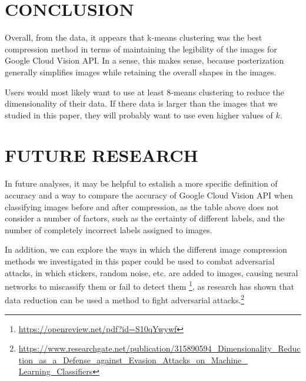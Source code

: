 \documentclass[letterpaper, 12 pt, conference]{ieeeconf}  %
\begin{document}
\section{CONCLUSION}

Overall, from the data, it appears that k-means clustering was
the best compression method in terms of maintaining the legibility
of the images for Google Cloud Vision API. In a sense, this makes
sense, because posterization generally simplifies images while
retaining the overall shapes in the images.

Users would most likely want to use at least 8-means clustering
to reduce the dimensionality of their data.
If there data is larger than the images that we studied in this paper,
they will probably want to use even higher values of $k$.

\section{FUTURE RESEARCH}

In future analyses, it may be helpful to estalish a more
specific definition of accuracy and a way to compare
the accuracy of Google Cloud Vision API when classifying
images before and after compression, as the table
above does not consider a number of factors, such as
the certainty of different labels, and the number
of completely incorrect labels assigned to images.

In addition, we can explore the ways in which the different
image compression methods we investigated in this paper
could be used to combat adversarial attacks, in which
stickers, random noise, etc. are added to images, causing
neural networks to miscassify them or fail to detect them
\footnote{\url{https://openreview.net/pdf?id=S10qYwywf}},
as research has shown that data reduction can be used a method to fight
adversarial attacks.\footnote{\url{https://www.researchgate.net/publication/315890594\_Dimensionality\_Reduction\_as\_a\_Defense\_against\_Evasion\_Attacks\_on\_Machine\_ Learning\_Classifiers}}


\addtolength{\textheight}{-12cm}   %
\end{document}
